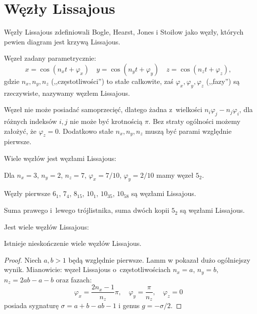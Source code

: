 
\section{Węzły Lissajous}
%
Węzły Lissajous zdefiniowali Bogle, Hearst, Jones i Stoiłow \cite{bogle94} jako węzły, których pewien diagram jest krzywą Lissajous.
%
%
%
%

\begin{definition}
    Węzeł zadany parametrycznie:
    \begin{equation}
        x = \cos(n_xt + \varphi_x) \quad
        y = \cos(n_yt + \varphi_y) \quad
        z = \cos(n_zt + \varphi_z),
    \end{equation}
    gdzie $n_x, n_y, n_z$ (,,częstotliwości'') to stałe całkowite, zaś $\varphi_x, \varphi_y, \varphi_z$ (,,fazy'') są rzeczywiste, nazywamy węzłem Lissajous.
\end{definition}

Węzeł nie może posiadać samoprzecięć, dlatego żadna z~wielkości $n_i\varphi_j-n_j\varphi_i$, dla różnych indeksów $i, j$ nie może być krotnością $\pi$.
Bez straty ogólności możemy założyć, że $\varphi_z = 0$.
Dodatkowo stałe $n_x, n_y, n_z$ muszą być parami względnie pierwsze.

Wiele węzłów jest węzłami Lissajous:

\begin{example}
    Dla $n_x = 3$, $n_y = 2$, $n_z = 7$, $\varphi_x = 7/10$, $\varphi_y = 2/10$ mamy węzeł $5_2$.
\end{example}

\begin{example}
    Węzły pierwsze $6_1$, $7_4$, $8_{15}$, $10_1$, $10_{35}$, $10_{58}$ są węzłami Lissajous.
\end{example}

\begin{example}
    Suma prawego i~lewego trójlistnika, suma dwóch kopii $5_2$ są węzłami Lissajous.
\end{example}

Jest wiele węzłów Lissajous:

\begin{proposition}
    Istnieje nieskończenie wiele węzłów Lissajous.
\end{proposition}

\begin{proof}
    Niech $a, b > 1$ będą względnie pierwsze.
    Lamm w \cite{lamm97} pokazał dużo ogólniejszy wynik.
    Mianowicie: węzeł Lissajous o~częstotliwościach $n_x = a$, $n_y = b$, $n_z = 2ab-a-b$ oraz fazach:
    \begin{equation}
        \varphi_x = \frac{2n_x-1}{n_z} \pi, \quad
        \varphi_y = \frac{\pi}{n_z}, \quad
        \varphi_z = 0
    \end{equation}
%
%
    posiada sygnaturę $\sigma = a+b-ab-1$ i genus $g = -\sigma/2$.
\end{proof}


